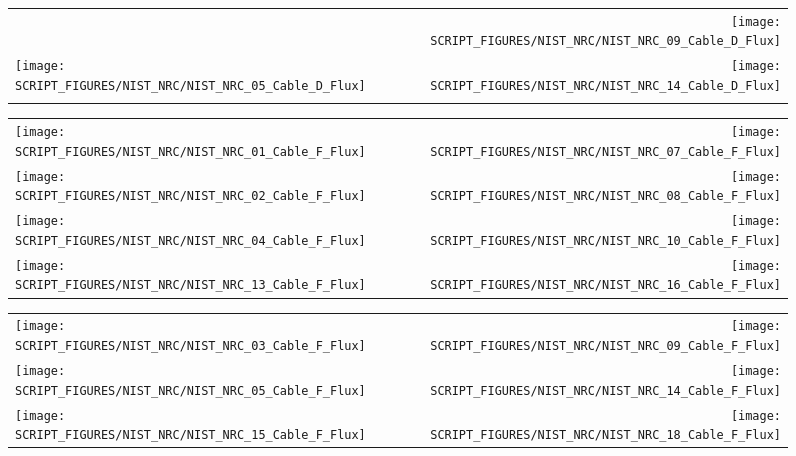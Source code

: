 \begin{figure}[!ht]
\begin{tabular*}{\textwidth}{l@{\extracolsep{\fill}}r}
                           &
\texttt{[image: SCRIPT\_FIGURES/NIST\_NRC/NIST\_NRC\_09\_Cable\_D\_Flux]} \\
\texttt{[image: SCRIPT\_FIGURES/NIST\_NRC/NIST\_NRC\_05\_Cable\_D\_Flux]} &
\texttt{[image: SCRIPT\_FIGURES/NIST\_NRC/NIST\_NRC\_14\_Cable\_D\_Flux]} \\
                      &
\end{tabular*}
\label{NIST_NRC_Cable_D_Flux_Open}
\end{figure}

\begin{figure}[!ht]
\begin{tabular*}{\textwidth}{l@{\extracolsep{\fill}}r}
\texttt{[image: SCRIPT\_FIGURES/NIST\_NRC/NIST\_NRC\_01\_Cable\_F\_Flux]} &
\texttt{[image: SCRIPT\_FIGURES/NIST\_NRC/NIST\_NRC\_07\_Cable\_F\_Flux]} \\
\texttt{[image: SCRIPT\_FIGURES/NIST\_NRC/NIST\_NRC\_02\_Cable\_F\_Flux]} &
\texttt{[image: SCRIPT\_FIGURES/NIST\_NRC/NIST\_NRC\_08\_Cable\_F\_Flux]} \\
\texttt{[image: SCRIPT\_FIGURES/NIST\_NRC/NIST\_NRC\_04\_Cable\_F\_Flux]} &
\texttt{[image: SCRIPT\_FIGURES/NIST\_NRC/NIST\_NRC\_10\_Cable\_F\_Flux]} \\
\texttt{[image: SCRIPT\_FIGURES/NIST\_NRC/NIST\_NRC\_13\_Cable\_F\_Flux]} &
\texttt{[image: SCRIPT\_FIGURES/NIST\_NRC/NIST\_NRC\_16\_Cable\_F\_Flux]}
\end{tabular*}
\label{NIST_NRC_Cable_F_Flux_Closed}
\end{figure}

\begin{figure}[!ht]
\begin{tabular*}{\textwidth}{l@{\extracolsep{\fill}}r}
\texttt{[image: SCRIPT\_FIGURES/NIST\_NRC/NIST\_NRC\_03\_Cable\_F\_Flux]} &
\texttt{[image: SCRIPT\_FIGURES/NIST\_NRC/NIST\_NRC\_09\_Cable\_F\_Flux]} \\
\texttt{[image: SCRIPT\_FIGURES/NIST\_NRC/NIST\_NRC\_05\_Cable\_F\_Flux]} &
\texttt{[image: SCRIPT\_FIGURES/NIST\_NRC/NIST\_NRC\_14\_Cable\_F\_Flux]} \\
\texttt{[image: SCRIPT\_FIGURES/NIST\_NRC/NIST\_NRC\_15\_Cable\_F\_Flux]} &
\texttt{[image: SCRIPT\_FIGURES/NIST\_NRC/NIST\_NRC\_18\_Cable\_F\_Flux]}
\end{tabular*}
\label{NIST_NRC_Cable_F_Flux_Open}
\end{figure}

